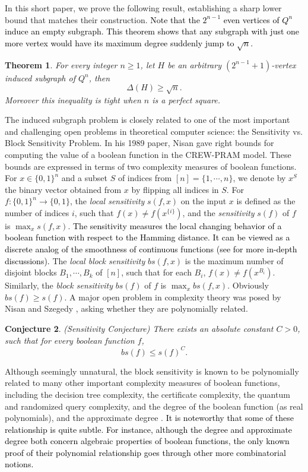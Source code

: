 \documentclass[12pt]{article}
\theoremstyle{plain}
\newtheorem{theorem}{Theorem}[section]
\newtheorem{conjecture}[theorem]{Conjecture}
\theoremstyle{definition}
\begin{document}
In this short paper, we prove the following result, establishing a sharp lower bound that matches their construction. \textcolor{black}{Note that the $2^{n-1}$ even vertices of $Q^n$ induce an empty subgraph. This theorem shows that any subgraph with just one more vertex would have its maximum degree suddenly jump to $\sqrt{n}$.} 
\begin{theorem}\label{thm_main}
For every integer $n \ge 1$, let $H$ be an arbitrary $(2^{n-1}+1)$-vertex induced subgraph of $Q^n$, then 
$$\Delta(H) \ge \sqrt{n}.$$
Moreover this inequality is tight when $n$ is a perfect square.
\end{theorem}
The induced subgraph problem is closely related to one of the most important and challenging open problems in theoretical computer science: the Sensitivity vs. Block Sensitivity Problem. In his 1989 paper, Nisan \cite{nisan} gave right bounds for computing the value of a boolean function in the CREW-PRAM model. These bounds are expressed in terms of two complexity measures of boolean functions. For $x \in \{0, 1\}^n$ and a subset $S$ of indices from $[n]=\{1, \cdots, n\}$, we denote by $x^S$ the binary vector obtained from $x$ by flipping all indices in $S$. For $f: \{0, 1\}^n \rightarrow \{0, 1\}$, the {\it local sensitivity} $s(f, x)$ on the input $x$ is defined as the number of indices $i$, such that $f(x) \neq f(x^{\{i\}})$, and the {\it sensitivity} $s(f)$ of $f$ is $\max_{x} s(f, x)$. \textcolor{black}{The sensitivity measures the local changing behavior of a boolean function with respect to the Hamming distance. It can be viewed as a discrete analog of the smoothness of continuous functions (see \cite{GNSTW} for more in-depth discussions).} The {\it local block sensitivity} $bs(f, x)$ is the maximum number of disjoint blocks $B_1, \cdots, B_k$ of $[n]$, such that for each $B_i$, $f(x) \neq f(x^{B_i})$. Similarly, the {\it block sensitivity} $bs(f)$ of $f$ is $\max_{x} bs(f, x)$. Obviously $bs(f) \ge s(f)$. A major open problem in complexity theory was posed by Nisan and Szegedy \cite{nisan-szegedy}, asking whether they are polynomially related.
\begin{conjecture} (Sensitivity Conjecture) 
There exists an absolute constant $C>0$, such that for every boolean function $f$, 
$$bs(f) \le s(f)^C.$$
\end{conjecture}

Although seemingly unnatural, the block sensitivity is known to be polynomially related to many other important complexity measures of boolean functions, including the decision tree complexity, the certificate complexity, the quantum and randomized query complexity, and the degree of the boolean function (as real polynomials), and the approximate degree \cite{survey}. \textcolor{black}{It is noteworthy that some of these relationship is quite subtle. For instance, although the degree and approximate degree both concern algebraic properties of boolean functions, the only known proof of their polynomial relationship goes through other more combinatorial notions.}
\end{document}
